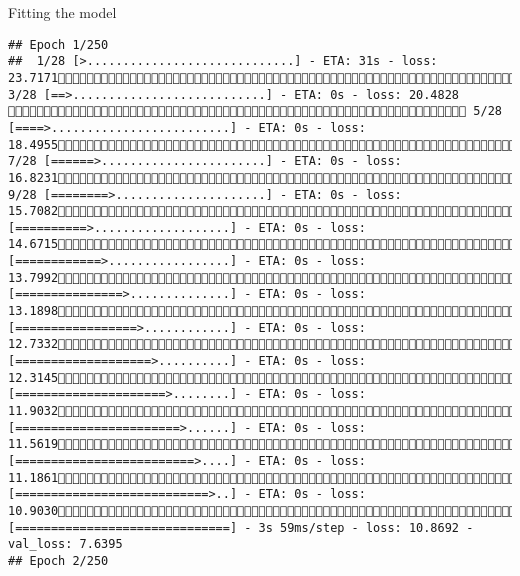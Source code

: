 \documentclass[
  ignorenonframetext,
]{beamer}
\begin{document}
\begin{frame}[fragile]{Fitting the model}
\begin{verbatim}
## Epoch 1/250
##  1/28 [>.............................] - ETA: 31s - loss: 23.7171 3/28 [==>...........................] - ETA: 0s - loss: 20.4828  5/28 [====>.........................] - ETA: 0s - loss: 18.4955 7/28 [======>.......................] - ETA: 0s - loss: 16.8231 9/28 [========>.....................] - ETA: 0s - loss: 15.708211/28 [==========>...................] - ETA: 0s - loss: 14.671513/28 [============>.................] - ETA: 0s - loss: 13.799215/28 [===============>..............] - ETA: 0s - loss: 13.189817/28 [=================>............] - ETA: 0s - loss: 12.733219/28 [===================>..........] - ETA: 0s - loss: 12.314521/28 [=====================>........] - ETA: 0s - loss: 11.903223/28 [=======================>......] - ETA: 0s - loss: 11.561925/28 [=========================>....] - ETA: 0s - loss: 11.186127/28 [===========================>..] - ETA: 0s - loss: 10.903028/28 [==============================] - 3s 59ms/step - loss: 10.8692 - val_loss: 7.6395
## Epoch 2/250

\end{verbatim}
\end{frame}
\end{document}
